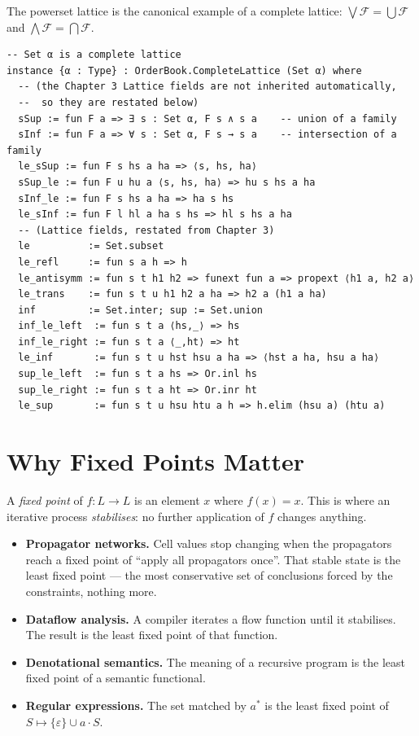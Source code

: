 \documentclass[12pt, a4paper, openright]{book}
\theoremstyle{thmstyle}
\theoremstyle{defstyle}
\begin{document}
The powerset lattice is the canonical example of a complete lattice:
$\bigvee \mathcal{F} = \bigcup \mathcal{F}$ and
$\bigwedge \mathcal{F} = \bigcap \mathcal{F}$.

\begin{verbatim}
-- Set α is a complete lattice
instance {α : Type} : OrderBook.CompleteLattice (Set α) where
  -- (the Chapter 3 Lattice fields are not inherited automatically,
  --  so they are restated below)
  sSup := fun F a => ∃ s : Set α, F s ∧ s a    -- union of a family
  sInf := fun F a => ∀ s : Set α, F s → s a    -- intersection of a family
  le_sSup := fun F s hs a ha => ⟨s, hs, ha⟩
  sSup_le := fun F u hu a ⟨s, hs, ha⟩ => hu s hs a ha
  sInf_le := fun F s hs a ha => ha s hs
  le_sInf := fun F l hl a ha s hs => hl s hs a ha
  -- (Lattice fields, restated from Chapter 3)
  le          := Set.subset
  le_refl     := fun s a h => h
  le_antisymm := fun s t h1 h2 => funext fun a => propext ⟨h1 a, h2 a⟩
  le_trans    := fun s t u h1 h2 a ha => h2 a (h1 a ha)
  inf         := Set.inter; sup := Set.union
  inf_le_left  := fun s t a ⟨hs,_⟩ => hs
  inf_le_right := fun s t a ⟨_,ht⟩ => ht
  le_inf       := fun s t u hst hsu a ha => ⟨hst a ha, hsu a ha⟩
  sup_le_left  := fun s t a hs => Or.inl hs
  sup_le_right := fun s t a ht => Or.inr ht
  le_sup       := fun s t u hsu htu a h => h.elim (hsu a) (htu a)
\end{verbatim}

\section{Why Fixed Points Matter}

A \emph{fixed point} of $f : L \to L$ is an element $x$ where $f(x) = x$.
This is where an iterative process \emph{stabilises}: no further application
of $f$ changes anything.

\begin{itemize}
  \item \textbf{Propagator networks.} Cell values stop changing when the
    propagators reach a fixed point of ``apply all propagators once''. That
    stable state is the least fixed point --- the most conservative set of
    conclusions forced by the constraints, nothing more.

  \item \textbf{Dataflow analysis.} A compiler iterates a flow function until
    it stabilises. The result is the least fixed point of that function.

  \item \textbf{Denotational semantics.} The meaning of a recursive program
    is the least fixed point of a semantic functional.

  \item \textbf{Regular expressions.} The set matched by $a^*$ is the least
    fixed point of $S \mapsto \{\varepsilon\} \cup a \cdot S$.
\end{itemize}
\end{document}

